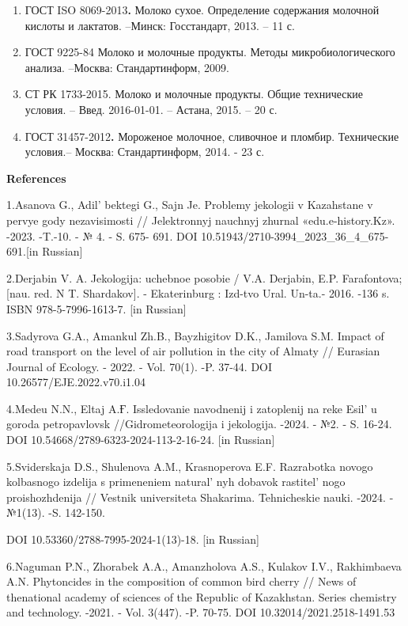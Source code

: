 {{\begin{enumerate}
  ГОСТ 31085-2002{\bfseries .} Молоко и молочные продукты. Метод
  определения сахарозы и глюкозы. -Минск, 2003. -- 8 с.
\item
  ГОСТ ISO 8069-2013{\bfseries .} Молоко сухое. Определение содержания
  молочной кислоты и лактатов. --Минск: Госстандарт, 2013. -- 11 с.
\item
  ГОСТ 9225-84 Молоко и молочные продукты. Методы микробиологического
  анализа. --Москва: Стандартинформ, 2009.
\item
  СТ РК 1733-2015. Молоко и молочные продукты. Общие технические
  условия. -- Введ. 2016-01-01. -- Астана, 2015. -- 20 с.
\item
  ГОСТ 31457-2012{\bfseries .} Мороженое молочное, сливочное и пломбир.
  Технические условия.-- Москва: Стандартинформ, 2014. - 23 с.
\end{enumerate}

{\bfseries References}

1.Asanova G., Adil' bektegi G., Sajn Je. Problemy
jekologii v Kazahstane v pervye gody nezavisimosti // Jelektronnyj
nauchnyj zhurnal «edu.e-history.Kz». -2023. -T.-10. - № 4. - S. 675-
691. DOI 10.51943/2710-3994\_2023\_36\_4\_675-691.{[}in Russian{]}

2.Derjabin V. A. Jekologija: uchebnoe posobie / V.A. Derjabin, E.P.
Farafontova; {[}nau. red. N T. Shardakov{]}. - Ekaterinburg : Izd-tvo
Ural. Un-ta.- 2016. -136 s. ISBN 978-5-7996-1613-7. {[}in Russian{]}

3.Sadyrova G.A., Amankul Zh.B., Bayzhigitov D.K., Jamilova S.M. Impact
of road transport on the level of air pollution in the city of Almaty //
Eurasian Journal of Ecology. - 2022. - Vol. 70(1). -P. 37-44. DOI
10.26577/EJE.2022.v70.i1.04

4.Medeu N.N., Eltaj A.Ғ. Issledovanie navodnenij i zatoplenij na reke
Esil'{} u goroda petropavlovsk //Gidrometeorologija i
jekologija. -2024. - №2. - S. 16-24. DOI
10.54668/2789-6323-2024-113-2-16-24. {[}in Russian{]}

5.Sviderskaja D.S., Shulenova A.M., Krasnoperova E.F. Razrabotka novogo
kolbasnogo izdelija s primeneniem natural' nyh dobavok
rastitel' nogo proishozhdenija // Vestnik universiteta
Shakarima. Tehnicheskie nauki. -2024. - №1(13). -S. 142-150.

DOI 10.53360/2788-7995-2024-1(13)-18. {[}in Russian{]}

6.Naguman P.N., Zhorabek A.A., Amanzholova A.S., Kulakov I.V.,
Rakhimbaeva A.N. Phytoncides in the composition of common bird cherry //
News of thenational academy of sciences of the Republic of Kazakhstan.
Series chemistry and technology. -2021. - Vol. 3(447). -P. 70-75. DOI
10.32014/2021.2518-1491.53

}}
